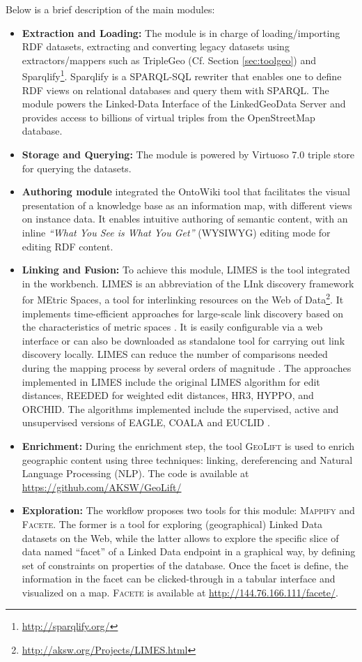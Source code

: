 Below is a brief description of the main modules:
\begin{itemize}
\item \textbf{Extraction and Loading:} The module is in charge of loading/importing RDF datasets, extracting and converting legacy datasets using extractors/mappers such as TripleGeo (Cf. Section \ref{sec:toolgeo}) and Sparqlify\footnote{\url{http://sparqlify.org/}}. Sparqlify is a SPARQL-SQL rewriter that enables one to define RDF views on relational databases and query them with SPARQL. The module powers the Linked-Data Interface of the LinkedGeoData Server and provides access to billions of virtual triples from the OpenStreetMap database.
\item \textbf{Storage and Querying:} The module is powered by Virtuoso 7.0 triple store for querying the datasets.
\item \textbf{Authoring module} integrated the OntoWiki tool \cite{ontowiki14} that facilitates the visual presentation of a knowledge base as an information map, with different views on instance data. It enables intuitive authoring of semantic content, with an inline \textit{``What You See is What You Get''} (WYSIWYG) editing mode for editing RDF content.
\item \textbf{Linking and Fusion:} To achieve this module, LIMES is the tool integrated in the workbench. LIMES is an abbreviation of the LInk discovery framework for MEtric Spaces, a tool for interlinking resources on the Web of Data\footnote{\url{http://aksw.org/Projects/LIMES.html}}. It implements time-efficient approaches for large-scale link discovery based on the characteristics of metric spaces \cite{ngau11}. It is easily configurable via a web interface or can also be downloaded as standalone tool for carrying out link discovery locally. LIMES can reduce the number of comparisons needed during the mapping process by several orders of magnitude \cite{song13}. The approaches implemented in LIMES include the original LIMES algorithm for edit distances, REEDED for weighted edit distances, HR3, HYPPO, and ORCHID. The algorithms implemented  include the supervised, active and unsupervised versions of EAGLE, COALA and EUCLID \cite{ngon13}.

\item \textbf{Enrichment:} During the enrichment step, the tool \textsc{GeoLift} \cite{geolift14} is used to enrich geographic content using three techniques: linking, dereferencing and Natural Language Processing (NLP). The code is available at \url{https://github.com/AKSW/GeoLift/}

\item \textbf{Exploration:} The workflow proposes two tools for this module: \textsc{Mappify} and \textsc{Facete}. The former is a tool for exploring (geographical) Linked Data datasets on the Web, while the latter allows  to explore the specific slice of data named ``facet''  of a Linked Data endpoint in a graphical way, by defining set of constraints on properties of the database. Once the facet is define, the information in the facet can be clicked-through in a tabular interface and visualized on a map. \textsc{Facete} is available at \url{http://144.76.166.111/facete/}.
\end{itemize}

